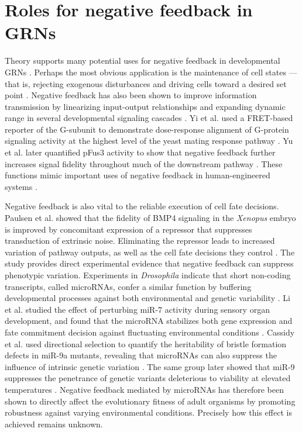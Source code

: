 \section{Roles for negative feedback in GRNs}
 
Theory supports many potential uses for negative feedback in developmental GRNs \cite{Freeman2000}. Perhaps the most obvious application is the maintenance of cell states --- that is, rejecting exogenous disturbances and driving cells toward a desired set point \cite{Alon2007,Behar2007,Yi2000}. Negative feedback has also been shown to improve information transmission by linearizing input-output relationships and expanding dynamic range in several developmental signaling cascades \cite{Bhalla2002,Cheong2011,Paulsen2011,Yi2003,Yu2008}. Yi et al. used a FRET-based reporter of the G\textalpha-subunit to demonstrate dose-response alignment of G-protein signaling activity at the highest level of the yeast mating response pathway \cite{Yi2003}. Yu et al. later quantified pFus3 activity to show that negative feedback further increases signal fidelity throughout much of the downstream pathway \cite{Yu2008}. These functions mimic important uses of negative feedback in human-engineered systems \cite{Black,Seborg2000}.

Negative feedback is also vital to the reliable execution of cell fate decisions. Paulsen et al. showed that the fidelity of BMP4 signaling in the \textit{Xenopus} embryo is improved by concomitant expression of a repressor that suppresses transduction of extrinsic noise. Eliminating the repressor leads to increased variation of pathway outputs, as well as the cell fate decisions they control \cite{Paulsen2011}. The study provides direct experimental evidence that negative feedback can suppress phenotypic variation. Experiments in \textit{Drosophila} indicate that short non-coding transcripts, called microRNAs, confer a similar function by buffering developmental processes against both environmental and genetic variability \cite{Cassidy2016,Cassidy2013,Li2009}. Li et al. studied the effect of perturbing miR-7 activity during sensory organ development, and found that the microRNA stabilizes both gene expression and fate commitment decision against fluctuating environmental conditions \cite{Li2009}. Cassidy et al. used directional selection to quantify the heritability of bristle formation defects in miR-9a mutants, revealing that microRNAs can also suppress the influence of intrinsic genetic variation \cite{Cassidy2013}. The same group later showed that miR-9 suppresses the penetrance of genetic variants deleterious to viability at elevated temperatures \cite{Cassidy2016}. Negative feedback mediated by microRNAs has therefore been shown to directly affect the evolutionary fitness of adult organisms by promoting robustness against varying environmental conditions. Precisely how this effect is achieved remains unknown.

